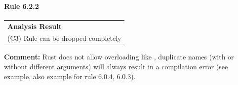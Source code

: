 \paragraph{Rule 6.2.2}
\begin{longtable}{p{13cm}}
\textbf{Analysis Result} \\
(C3) Rule can be dropped completely \\
\end{longtable}
\textbf{Comment:} Rust does not allow overloading like \Cpp, duplicate names (with or without different arguments) will always result in a compilation error (see example, also example for rule 6.0.4, 6.0.3). \\


